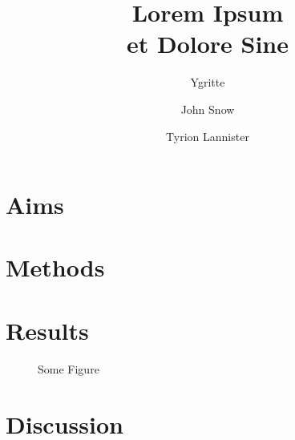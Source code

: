\documentclass[a4paper]{p-oldpaper}
\title{Lorem Ipsum\\ et Dolore Sine}
\author[1]{Ygritte}
\author[1]{John Snow}
\author[2]{Tyrion Lannister}
\affil[1]{House Stark}
\affil[2]{House Lannister}
\begin{document}
\begin{multicols}{4}

	\section{Aims}
	\blindtext

	\section{Methods}
	\blindtext
	
	\section{Results}
	\blindtext
	
	\begin{figure}[H]
		\begin{center}
		\begin{pgfpicture}
		\end{pgfpicture}
		\end{center}
		\caption{Some Figure}
	\end{figure}
	
	\blindtext
	
	\blindtext
	
	\section{Discussion}
	\blindtext
	
	\blindtext
	
\end{multicols}
\end{document}
